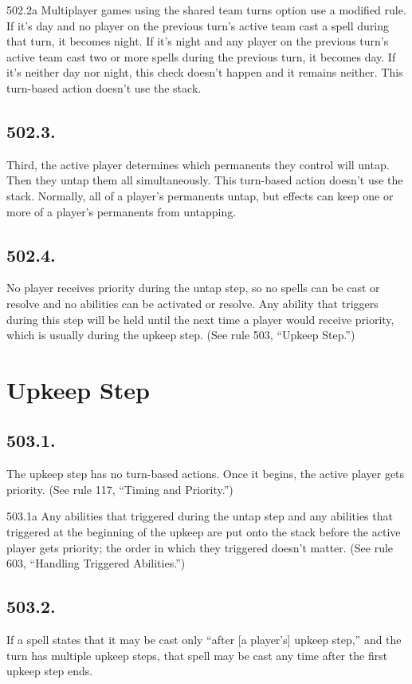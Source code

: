 502.2a Multiplayer games using the shared team turns option use a modified rule. If it’s day and no player on the previous turn’s active team cast a spell during that turn, it becomes night. If it’s night and any player on the previous turn’s active team cast two or more spells during the previous turn, it becomes day. If it’s neither day nor night, this check doesn’t happen and it remains neither. This turn-based action doesn’t use the stack.

\subsection*{502.3.}
Third, the active player determines which permanents they control will untap. Then they untap them all simultaneously. This turn-based action doesn’t use the stack. Normally, all of a player’s permanents untap, but effects can keep one or more of a player’s permanents from untapping.

\subsection*{502.4.}
No player receives priority during the untap step, so no spells can be cast or resolve and no abilities can be activated or resolve. Any ability that triggers during this step will be held until the next time a player would receive priority, which is usually during the upkeep step. (See rule 503, “Upkeep Step.”)

\section{Upkeep Step}
\subsection*{503.1.}
The upkeep step has no turn-based actions. Once it begins, the active player gets priority. (See rule 117, “Timing and Priority.”)

503.1a Any abilities that triggered during the untap step and any abilities that triggered at the beginning of the upkeep are put onto the stack before the active player gets priority; the order in which they triggered doesn’t matter. (See rule 603, “Handling Triggered Abilities.”)

\subsection*{503.2.}
If a spell states that it may be cast only “after [a player’s] upkeep step,” and the turn has multiple upkeep steps, that spell may be cast any time after the first upkeep step ends.

